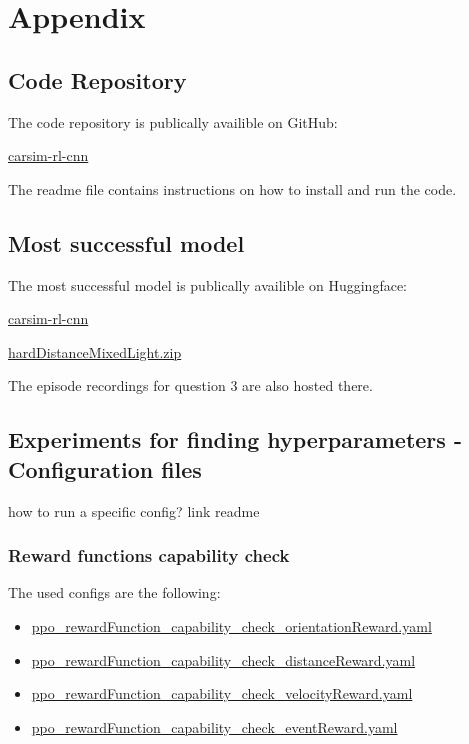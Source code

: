 \chapter{Appendix}
\label{cha:Appendix}

\section{Code Repository}

The code repository is publically availible on GitHub:

\href{https://github.com/geschnee/carsim-rl-cnn}{carsim-rl-cnn}

The readme file contains instructions on how to install and run the code.

\section{Most successful model}

The most successful model is publically availible on Huggingface:

\href{https://huggingface.co/geschnee/carsim-rl-cnn}{carsim-rl-cnn}

\href{https://huggingface.co/geschnee/carsim-rl-cnn/blob/main/models/hardDistanceMixedLight.zip}{hardDistanceMixedLight.zip}

The episode recordings for question 3 are also hosted there.

\section{Experiments for finding hyperparameters - Configuration files}
\label{cha:experiment_configs}

how to run a specific config? link readme

\subsection{Reward functions capability check}
The used configs are the following:
\begin{itemize}
    \item \href{https://github.com/geschnee/carsim-rl-cnn/tree/main/python/cfg/ppo_rewardFunction_capability_check_orientationReward.yaml}{ppo\_rewardFunction\_capability\_check\_orientationReward.yaml}
    \item \href{https://github.com/geschnee/carsim-rl-cnn/tree/main/python/cfg/ppo_rewardFunction_capability_check_distanceReward.yaml}{ppo\_rewardFunction\_capability\_check\_distanceReward.yaml}
    \item \href{https://github.com/geschnee/carsim-rl-cnn/tree/main/python/cfg/ppo_rewardFunction_capability_check_velocityReward.yaml}{ppo\_rewardFunction\_capability\_check\_velocityReward.yaml}
    \item \href{https://github.com/geschnee/carsim-rl-cnn/tree/main/python/cfg/ppo_rewardFunction_capability_check_eventReward.yaml}{ppo\_rewardFunction\_capability\_check\_eventReward.yaml}
\end{itemize}


